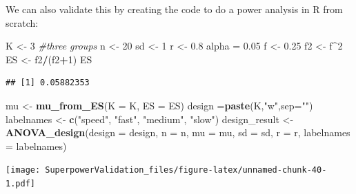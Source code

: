 \documentclass[]{book}
\newenvironment{Shaded}{\begin{snugshade}}{\end{snugshade}}
\newcommand{\CommentTok}[1]{\textcolor[rgb]{0.56,0.35,0.01}{\textit{#1}}}
\newcommand{\DataTypeTok}[1]{\textcolor[rgb]{0.13,0.29,0.53}{#1}}
\newcommand{\DecValTok}[1]{\textcolor[rgb]{0.00,0.00,0.81}{#1}}
\newcommand{\FloatTok}[1]{\textcolor[rgb]{0.00,0.00,0.81}{#1}}
\newcommand{\KeywordTok}[1]{\textcolor[rgb]{0.13,0.29,0.53}{\textbf{#1}}}
\newcommand{\NormalTok}[1]{#1}
\newcommand{\OperatorTok}[1]{\textcolor[rgb]{0.81,0.36,0.00}{\textbf{#1}}}
\newcommand{\StringTok}[1]{\textcolor[rgb]{0.31,0.60,0.02}{#1}}
\begin{document}
We can also validate this by creating the code to do a power analysis in R from scratch:

\begin{Shaded}
\begin{Highlighting}[]
\NormalTok{K <-}\StringTok{ }\DecValTok{3} \CommentTok{#three groups}
\NormalTok{n <-}\StringTok{ }\DecValTok{20}
\NormalTok{sd <-}\StringTok{ }\DecValTok{1}
\NormalTok{r <-}\StringTok{ }\FloatTok{0.8}
\NormalTok{alpha =}\StringTok{ }\FloatTok{0.05}
\NormalTok{f <-}\StringTok{ }\FloatTok{0.25}
\NormalTok{f2 <-}\StringTok{ }\NormalTok{f}\OperatorTok{^}\DecValTok{2}
\NormalTok{ES <-}\StringTok{ }\NormalTok{f2}\OperatorTok{/}\NormalTok{(f2}\OperatorTok{+}\DecValTok{1}\NormalTok{)}
\NormalTok{ES}
\end{Highlighting}
\end{Shaded}

\begin{verbatim}
## [1] 0.05882353
\end{verbatim}

\begin{Shaded}
\begin{Highlighting}[]
\NormalTok{mu <-}\StringTok{ }\KeywordTok{mu_from_ES}\NormalTok{(}\DataTypeTok{K =}\NormalTok{ K, }\DataTypeTok{ES =}\NormalTok{ ES)}
\NormalTok{design =}\KeywordTok{paste}\NormalTok{(K,}\StringTok{"w"}\NormalTok{,}\DataTypeTok{sep=}\StringTok{""}\NormalTok{)}
\NormalTok{labelnames <-}\StringTok{ }\KeywordTok{c}\NormalTok{(}\StringTok{"speed"}\NormalTok{, }\StringTok{"fast"}\NormalTok{, }\StringTok{"medium"}\NormalTok{, }\StringTok{"slow"}\NormalTok{)}
\NormalTok{design_result <-}\StringTok{ }\KeywordTok{ANOVA_design}\NormalTok{(}\DataTypeTok{design =}\NormalTok{ design,}
                   \DataTypeTok{n =}\NormalTok{ n, }
                   \DataTypeTok{mu =}\NormalTok{ mu, }
                   \DataTypeTok{sd =}\NormalTok{ sd, }
                   \DataTypeTok{r =}\NormalTok{ r, }
                   \DataTypeTok{labelnames =}\NormalTok{ labelnames)}
\end{Highlighting}
\end{Shaded}

\texttt{[image: SuperpowerValidation\_files/figure-latex/unnamed-chunk-40-1.pdf]}

\begin{Shaded}
\end{Shaded}
\end{document}
